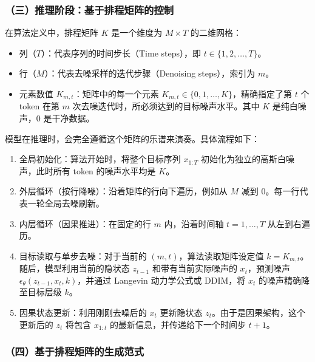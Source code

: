 \hypertarget{ux4e09ux63a8ux7406ux9636ux6bb5ux57faux4e8eux6392ux7a0bux77e9ux9635ux7684ux63a7ux5236}{%
\subsubsection{（三）推理阶段：基于排程矩阵的控制}\label{ux4e09ux63a8ux7406ux9636ux6bb5ux57faux4e8eux6392ux7a0bux77e9ux9635ux7684ux63a7ux5236}}

在算法定义中，排程矩阵 \(K\) 是一个维度为 \(M\times T\) 的二维网格：

\begin{itemize}
\tightlist
\item
  列（\(T\)）：代表序列的时间步长（Time steps），即 \(t\in\{1,2,\ldots,T\}\)。
\item
  行（\(M\)）：代表去噪采样的迭代步骤（Denoising steps），索引为 \(m\)。
\item
  元素数值 \(K_{m,t}\)：矩阵中的每一个元素 \(K_{m,t}\in\{0,1,\ldots,K\}\)，精确指定了第 \(t\) 个 token 在第 \(m\) 次去噪迭代时，所必须达到的目标噪声水平。其中 \(K\) 是纯白噪声，\(0\) 是干净数据。
\end{itemize}

模型在推理时，会完全遵循这个矩阵的乐谱来演奏。具体流程如下：

\begin{enumerate}
\def\labelenumi{\arabic{enumi}.}
\tightlist
\item
  全局初始化：算法开始时，将整个目标序列 \(x_{1:T}\) 初始化为独立的高斯白噪声，此时所有 token 的噪声水平均是 \(K\)。
\item
  外层循环（按行降噪）：沿着矩阵的行向下遍历，例如从 \(M\) 减到 \(0\)。每一行代表一轮全局去噪刷新。
\item
  内层循环（因果推进）：在固定的行 \(m\) 内，沿着时间轴 \(t=1,\ldots,T\) 从左到右遍历。
\item
  目标读取与单步去噪：对于当前的 \((m,t)\)，算法读取矩阵设定值 \(k=K_{m,t}\)。随后，模型利用当前的隐状态 \(z_{t-1}\) 和带有当前实际噪声的 \(x_t\)，预测噪声 \(\epsilon_\theta(z_{t-1},x_t,k)\)，并通过 Langevin 动力学公式或 DDIM，将 \(x_t\) 的噪声精确降至目标层级 \(k\)。
\item
  因果状态更新：利用刚刚去噪后的 \(x_t\) 更新隐状态 \(z_t\)。由于是因果架构，这个更新后的 \(z_t\) 将包含 \(x_{1:t}\) 的最新信息，并传递给下一个时间步 \(t+1\)。
\end{enumerate}

\hypertarget{ux56dbux57faux4e8eux6392ux7a0bux77e9ux9635ux7684ux751fux6210ux8303ux5f0f}{%
\subsubsection{（四）基于排程矩阵的生成范式}\label{ux56dbux57faux4e8eux6392ux7a0bux77e9ux9635ux7684ux751fux6210ux8303ux5f0f}}

